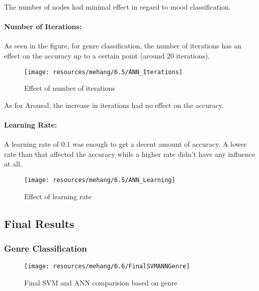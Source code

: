 The number of nodes had minimal effect in regard to mood classification. 

\paragraph{Number of Iterations:}
As seen in the figure, for genre classification, the number of iterations has an effect on the accuracy up to a certain point (around 20 iterations).\\

\begin{figure}[h!]
        \centering
        \texttt{[image: resources/mehang/6.5/ANN\_Iterations]}
        \caption{Effect of number of iterations}
\end{figure}

As for Arousal, the increase in iterations had no effect on the accuracy. 

\newpage
\paragraph{Learning Rate:}

A learning rate of 0.1 was enough to get a decent amount of accuracy. A lower rate than that affected the accuracy while a higher rate didn’t have any influence at all.
\begin{figure}[h!]
        \centering
        \texttt{[image: resources/mehang/6.5/ANN\_Learning]}
        \caption{Effect of learning rate}
\end{figure}
\newpage
\subsection{Final Results}
\subsubsection{Genre Classification}
\begin{figure}[h!]
        \centering
        \texttt{[image: resources/mehang/6.6/FinalSVMANNGenre]}
        \caption{Final SVM and ANN comparision based on genre}
\end{figure}

